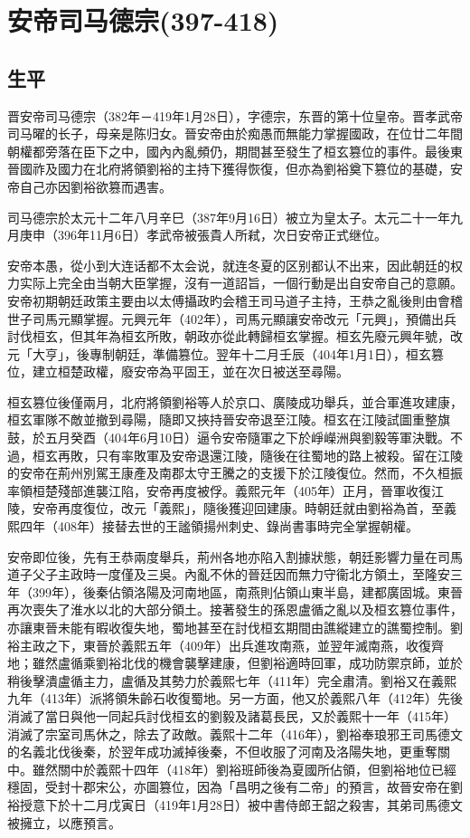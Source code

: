 
\section{安帝司马德宗\tiny(397-418)}

\subsection{生平}

晋安帝司马德宗（382年－419年1月28日），字德宗，东晋的第十位皇帝。晋孝武帝司马曜的长子，母亲是陈归女。晉安帝由於痴愚而無能力掌握國政，在位廿二年間朝權都旁落在臣下之中，國內內亂頻仍，期間甚至發生了桓玄篡位的事件。最後東晉國祚及國力在北府將領劉裕的主持下獲得恢復，但亦為劉裕奠下篡位的基礎，安帝自己亦因劉裕欲篡而遇害。

司马德宗於太元十二年八月辛巳（387年9月16日）被立为皇太子。太元二十一年九月庚申（396年11月6日）孝武帝被張貴人所弒，次日安帝正式继位。

安帝本愚，從小到大连话都不太会说，就连冬夏的区别都认不出来，因此朝廷的权力实际上完全由当朝大臣掌握，沒有一道詔旨，一個行動是出自安帝自己的意願。安帝初期朝廷政策主要由以太傅攝政旳会稽王司马道子主持，王恭之亂後則由會稽世子司馬元顯掌握。元興元年（402年），司馬元顯讓安帝改元「元興」，預備出兵討伐桓玄，但其年為桓玄所敗，朝政亦從此轉歸桓玄掌握。桓玄先廢元興年號，改元「大亨」，後專制朝廷，準備篡位。翌年十二月壬辰（404年1月1日），桓玄篡位，建立桓楚政權，廢安帝為平固王，並在次日被送至尋陽。

桓玄篡位後僅兩月，北府將領劉裕等人於京口、廣陵成功舉兵，並合軍進攻建康，桓玄軍隊不敵並撤到尋陽，隨即又挾持晉安帝退至江陵。桓玄在江陵試圖重整旗鼓，於五月癸酉（404年6月10日）逼令安帝隨軍之下於崢嶸洲與劉毅等軍決戰。不過，桓玄再敗，只有率敗軍及安帝退還江陵，隨後在往蜀地的路上被殺。留在江陵的安帝在荊州別駕王康產及南郡太守王騰之的支援下於江陵復位。然而，不久桓振率領桓楚殘部進襲江陷，安帝再度被俘。義熙元年（405年）正月，晉軍收復江陵，安帝再度復位，改元「義熙」，隨後獲迎回建康。時朝廷就由劉裕為首，至義熙四年（408年）接替去世的王謐領揚州刺史、錄尚書事時完全掌握朝權。

安帝即位後，先有王恭兩度舉兵，荊州各地亦陷入割據狀態，朝廷影響力量在司馬道子父子主政時一度僅及三吳。內亂不休的晉廷因而無力守衞北方領土，至隆安三年（399年），後秦佔領洛陽及河南地區，南燕則佔領山東半島，建都廣固城。東晉再次喪失了淮水以北的大部分領土。接著發生的孫恩盧循之亂以及桓玄篡位事件，亦讓東晉未能有暇收復失地，蜀地甚至在討伐桓玄期間由譙縱建立的譙蜀控制。劉裕主政之下，東晉於義熙五年（409年）出兵進攻南燕，並翌年滅南燕，收復齊地；雖然盧循乘劉裕北伐的機會襲擊建康，但劉裕適時回軍，成功防禦京師，並於稍後擊潰盧循主力，盧循及其勢力於義熙七年（411年）完全肅清。劉裕又在義熙九年（413年）派將領朱齡石收復蜀地。另一方面，他又於義熙八年（412年）先後消滅了當日與他一同起兵討伐桓玄的劉毅及諸葛長民，又於義熙十一年（415年）消滅了宗室司馬休之，除去了政敵。義熙十二年（416年），劉裕奉琅邪王司馬德文的名義北伐後秦，於翌年成功滅掉後秦，不但收服了河南及洛陽失地，更重奪關中。雖然關中於義熙十四年（418年）劉裕班師後為夏國所佔領，但劉裕地位已經穩固，受封十郡宋公，亦圖篡位，因為「昌明之後有二帝」的預言，故晉安帝在劉裕授意下於十二月戊寅日（419年1月28日）被中書侍郎王韶之殺害，其弟司馬德文被擁立，以應預言。

